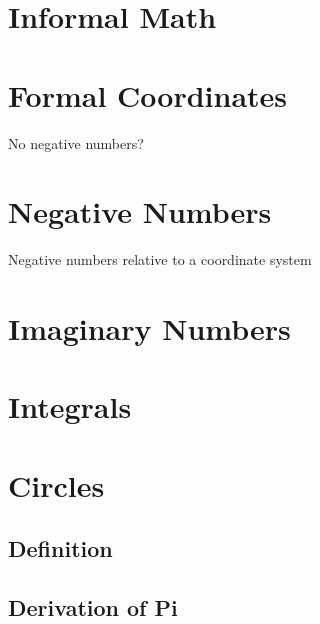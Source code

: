 \documentclass[11pt]{article}
\begin{document}
\section*{Informal Math}

\section{Formal Coordinates}
No negative numbers?

\section{Negative Numbers}
Negative numbers relative to a coordinate system

\section{Imaginary Numbers}

\section{Integrals}

\section{Circles}
\subsection{Definition}
\subsection{Derivation of Pi}
\end{document}
